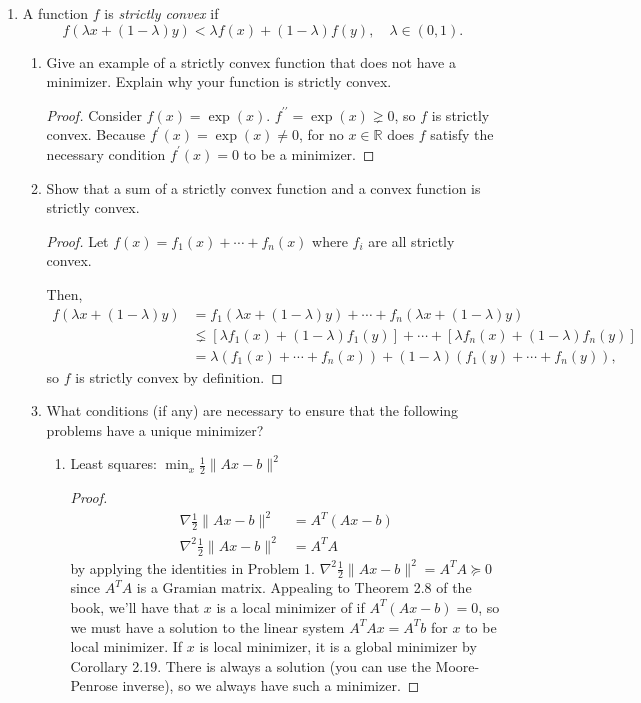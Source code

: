 \documentclass[11pt]{amsart}
\begin{document}
\begin{enumerate}
\bigskip\bigskip


\item A function $f$ is {\it strictly convex} if 
\[
f(\lambda x + (1-\lambda)y) < \lambda f(x) + (1-\lambda) f(y), \quad \lambda \in (0,1).
\]
\begin{enumerate}
\item Give an example of a strictly convex function that 
  does not have a minimizer. Explain why your function is strictly convex.
  \begin{proof}
    Consider $f(x) = \exp(x)$. $f^{\prime\prime} = \exp(x) \gneq 0$, so $f$ is
    strictly convex. Because $f^\prime(x) = \exp(x) \neq 0$, for no
    $x \in \mathbb{R}$ does $f$ satisfy the necessary condition
    $f^\prime(x) = 0$ to be a minimizer.
  \end{proof}
\item Show that a sum of a strictly convex function and a convex function is strictly convex.
  \begin{proof}
    Let $f(x) = f_1(x) + \cdots + f_n(x)$ where $f_i$ are all strictly convex.
    
    Then,
    \begin{align*}
      f(\lambda x + (1-\lambda)y)
      &= f_1(\lambda x + (1-\lambda)y) + \cdots + f_n(\lambda x + (1-\lambda)y) \\
      &\lneq \left[\lambda f_1(x) + (1-\lambda)f_1(y)\right] + \cdots + \left[\lambda f_n(x) + (1-\lambda)f_n(y)\right] \\
      &= \lambda\left(f_1(x) + \cdots + f_n(x)\right) + \left(1 - \lambda\right)\left(f_1(y) + \cdots + f_n(y)\right),
    \end{align*}
    so $f$ is strictly convex by definition.
  \end{proof}
\item What conditions (if any) are necessary to ensure that the following problems have a unique minimizer?  
\begin{enumerate}
\item Least squares: $\min_x \frac{1}{2}\|Ax - b\|^2$
  \begin{proof}    
    \begin{align*}
      \nabla \frac{1}{2}\|Ax - b\|^2
      &= A^T\left(Ax - b\right) \\
      \nabla^2 \frac{1}{2}\|Ax - b\|^2
      &= A^TA
    \end{align*}
    by applying the identities in Problem 1.
    $\nabla^2 \frac{1}{2}\|Ax - b\|^2 = A^TA \succeq 0$ since $A^TA$ is a
    Gramian matrix. Appealing to Theorem 2.8 of the book, we'll have that $x$ is
    a local minimizer of if $A^T\left(Ax - b\right) = 0$, so we must have a
    solution to the linear system $A^TAx = A^Tb$ for $x$ to be local
    minimizer. If $x$ is local minimizer, it is a global minimizer by Corollary
    2.19. There is always a solution (you can use the Moore-Penrose inverse), so
    we always have such a minimizer.


\end{proof}
\end{enumerate}
\end{enumerate}
\end{enumerate}
\end{document}
